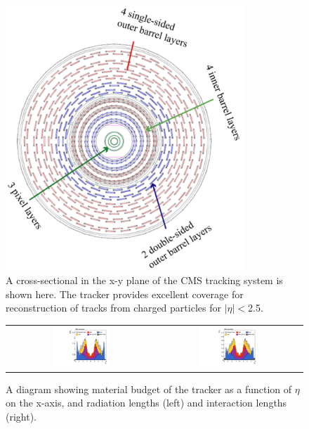 \begin{figure}[!htb]
\begin{center}
\includegraphics[width=0.8\textwidth]{cms/figs/Barrel.pdf}
\caption{
  A cross-sectional in the x-y plane of the CMS tracking system is shown here.
  The tracker provides excellent coverage for reconstruction of tracks from charged particles for $|\eta| < $2.5.
\label{fig:tracker}
}
\end{center}
\end{figure}

\begin{figure}[!htb]
  \begin{center}
  \begin{tabular}{c c}
    \includegraphics[width=0.4\textwidth]{cms/figs/figs_2011_cmsTracker_MaterialBudget_RadLengths.png} &
    \includegraphics[width=0.4\textwidth]{cms/figs/figs_2011_cmsTracker_MaterialBudget_InteractionLengths.png} \\
  \end{tabular}
    \caption{
      \label{fig:trackerbudget}
      A diagram showing material budget of the tracker as a function of $\eta$ on the x-axis, and radiation lengths (left) and interaction lengths (right).
    }
  \end{center}
\end{figure}


